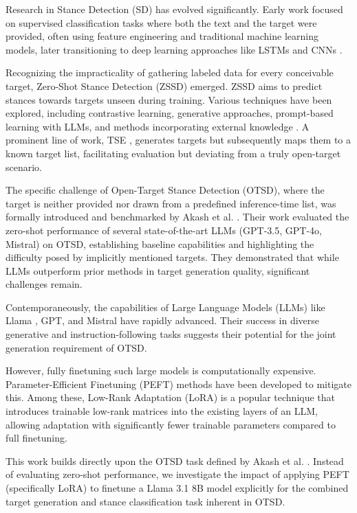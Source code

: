 \documentclass[twocolumn,11pt,letterpaper]{article}
\begin{document}
Research in Stance Detection (SD) has evolved significantly. Early work focused on supervised classification tasks where both the text and the target were provided, often using feature engineering and traditional machine learning models, later transitioning to deep learning approaches like LSTMs and CNNs \cite{vast}.

Recognizing the impracticality of gathering labeled data for every conceivable target, Zero-Shot Stance Detection (ZSSD) emerged. ZSSD aims to predict stances towards targets unseen during training. Various techniques have been explored, including contrastive learning, generative approaches, prompt-based learning with LLMs, and methods incorporating external knowledge \cite{vast}. A prominent line of work, TSE \cite{tse,tts}, generates targets but subsequently maps them to a known target list, facilitating evaluation but deviating from a truly open-target scenario.

The specific challenge of Open-Target Stance Detection (OTSD), where the target is neither provided nor drawn from a predefined inference-time list, was formally introduced and benchmarked by Akash et al. \cite{akash2024}. Their work evaluated the zero-shot performance of several state-of-the-art LLMs (GPT-3.5, GPT-4o, Mistral) on OTSD, establishing baseline capabilities and highlighting the difficulty posed by implicitly mentioned targets. They demonstrated that while LLMs outperform prior methods in target generation quality, significant challenges remain.

Contemporaneously, the capabilities of Large Language Models (LLMs) like Llama \cite{llama3.1}, GPT, and Mistral have rapidly advanced. Their success in diverse generative and instruction-following tasks suggests their potential for the joint generation requirement of OTSD.

However, fully finetuning such large models is computationally expensive. Parameter-Efficient Finetuning (PEFT) methods have been developed to mitigate this. Among these, Low-Rank Adaptation (LoRA) \cite{lora} is a popular technique that introduces trainable low-rank matrices into the existing layers of an LLM, allowing adaptation with significantly fewer trainable parameters compared to full finetuning.

This work builds directly upon the OTSD task defined by Akash et al. \cite{akash2024}. Instead of evaluating zero-shot performance, we investigate the impact of applying PEFT (specifically LoRA) to finetune a Llama 3.1 8B model explicitly for the combined target generation and stance classification task inherent in OTSD.
\end{document}
